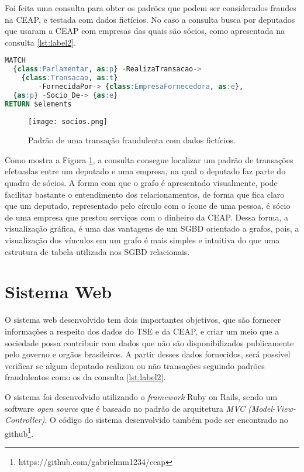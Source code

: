 Foi feita uma consulta para obter os padrões que podem ser considerados fraudes na CEAP, e testada com dados fictícios. No caso a consulta busca por deputados que usaram a CEAP com empresas das quais são sócios, como apresentada na consulta \ref{lst:label2}.

\begin{lstlisting}[label={lst:label2}, caption={Consulta de relacionamento de uso da CEAP entre deputados e empresas nas quais o deputado é sócio.},captionpos=b, language=sql]
MATCH 
  {class:Parlamentar, as:p} -RealizaTransacao-> 
  	{class:Transacao, as:t} 
    	-FornecidaPor-> {class:EmpresaFornecedora, as:e},
  {as:p} -Socio_De-> {as:e}
RETURN $elements
\end{lstlisting}

\begin{figure}[H]
\centering
\texttt{[image: socios.png]}
\caption{Padrão de uma transação fraudulenta com dados fictícios.}
\label{fig:socios}
\end{figure}

Como mostra a Figura \ref{fig:socios}, a consulta consegue localizar um padrão de transações efetuadas entre um deputado e uma empresa, na qual o deputado faz parte do quadro de sócios. A forma com que o grafo é apresentado visualmente, pode facilitar bastante o entendimento dos relacionamentos, de forma que fica claro que um deputado, representado pelo círculo com o ícone de uma pessoa, é sócio de uma empresa que prestou serviços com o dinheiro da CEAP. Dessa forma, a visualização gráfica, é uma das vantagens de um SGBD orientado a grafos, pois, a visualização dos vínculos em um grafo é mais simples e intuitiva do que uma estrutura de tabela utilizada nos SGBD relacionais.

\section{Sistema Web}

	O sistema web desenvolvido tem dois importantes objetivos, que são fornecer informações a respeito dos dados do TSE e da CEAP, e criar um meio que a sociedade possa contribuir com dados que não são disponibilizados publicamente pelo governo e orgãos brasileiros. A partir desses dados fornecidos, será possível verificar se algum deputado realizou ou não transações seguindo padrões fraudulentos como os da consulta \ref{lst:label2}.
	
	O sistema foi desenvolvido utilizando o \textit{framework} Ruby on Rails, sendo um software \textit{open source} que é baseado no padrão de arquitetura \textit{MVC (Model-View-Controller)}. O código do sistema desenvolvido também pode ser encontrado no github\footnote{https://github.com/gabrielmm1234/ceap}.


